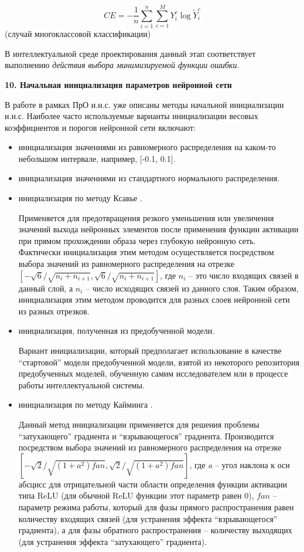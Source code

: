 \begin{equation*}
	CE = - \frac{1}{n} \sum_{i=1}^n \sum_{c=1}^M Y_i^c \log{\widetilde{Y}_i^c} 
\end{equation*}
(случай многоклассовой классификации)

В интеллектуальной среде проектирования данный этап соответствует выполнению \textit{действия выбора минимизируемой функции ошибки}.

\textbf{10. Начальная инициализация параметров нейронной сети}

В работе \cite{Kovalev2022} в рамках ПрО и.н.с. уже описаны методы начальной инициализации и.н.с. Наиболее часто используемые варианты инициализации весовых коэффициентов и порогов нейронной сети включают:
\begin{itemize}
	\item инициализация значениями из равномерного распределения на каком-то небольшом интервале, например, [-0.1, 0.1].
	\item инициализация значениями из стандартного нормального распределения.
	\item инициализация по методу Ксавье \cite{glorot2010}.
	
	Применяется для предотвращения  резкого уменьшения или увеличения значений выхода нейронных элементов после применения функции активации при прямом прохождении образа через глубокую нейронную сеть. Фактически инициализация этим методом осуществляется посредством выбора значений из равномерного распределения на отрезке $[- \sqrt{6} / \sqrt{n_i+n_{i+1}}, \sqrt{6} / \sqrt{n_i+n_{i+1}}]$, где $n_i$ -- это число входящих связей в данный слой, а $n_i$ -- число исходящих связей из данного слоя. Таким образом, инициализация этим методом проводится для разных слоев нейронной сети из разных отрезков.
	
	\item инициализация, полученная из предобученной модели.
	
	Вариант инициализации, который предполагает использование в качестве ``стартовой'' модели предобученной модели, взятой из некоторого репозитория предобученных моделей, обученную самим исследователем или в процессе работы интеллектуальной системы.
	
	\item инициализация по методу Кайминга \cite{he2015}.
	
	Данный метод инициализации применяется для решения проблемы ``затухающего'' градиента и ``взрывающегося''
	градиента. Производится посредством выбора значений из равномерного распределения на отрезке $[-\sqrt{2} / \sqrt{(1+a^2)fan}, \sqrt{2} / \sqrt{(1+a^2)fan}]$,
	где \textit{a} -- угол наклона к оси абсцисс для отрицательной части области определения функции активации типа ReLU (для обычной ReLU функции этот параметр равен 0), $fan$ -- параметр режима работы, который для фазы прямого распространения равен количеству входящих связей (для устранения эффекта ``взрывающегося'' градиента), а для фазы обратного распространения -- количеству выходящих (для устранения эффекта ``затухающего'' градиента).
\end{itemize}

